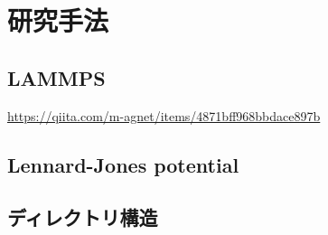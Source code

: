 \chapter{研究手法}

\section{LAMMPS}

\href{はじめてのLAMMPS}{https://qiita.com/m-agnet/items/4871bff968bbdace897b}

\section{Lennard-Jones potential}

\section{ディレクトリ構造}